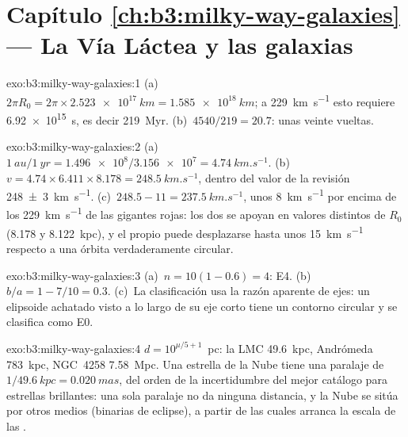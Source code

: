 \section*{Capítulo \ref{ch:b3:milky-way-galaxies} --- La Vía Láctea y las galaxias}

\begin{solution}{exo:b3:milky-way-galaxies:1}
(a)~$2\pi R_0 = 2\pi\times\qty{2.523e17}{km} = \qty{1.585e18}{km}$; a
\qty{229}{km.s^{-1}} esto requiere \qty{6.92e15}{s}, es decir
\qty{219}{Myr}. (b)~$4540/219 = 20.7$: unas veinte vueltas.
\end{solution}

\begin{solution}{exo:b3:milky-way-galaxies:2}
(a)~$\qty{1}{au}/\qty{1}{yr} = \num{1.496e8}/\num{3.156e7} =
\qty{4.74}{km.s^{-1}}$. (b)~$v = 4.74\times6.411\times8.178 =
\qty{248.5}{km.s^{-1}}$, dentro del valor de la revisión
\qty[separate-uncertainty=true]{248 \pm 3}{km.s^{-1}}. (c)~$248.5 - 11 = \qty{237.5}{km.s^{-1}}$,
unos \qty{8}{km.s^{-1}} por encima de los \qty{229}{km.s^{-1}} de las gigantes rojas:
los dos se apoyan en valores distintos de $R_0$ (8.178 y \qty{8.122}{kpc}),
y el propio  puede desplazarse hasta unos \qty{15}{km.s^{-1}} respecto
a una órbita verdaderamente circular.
\end{solution}

\begin{solution}{exo:b3:milky-way-galaxies:3}
(a)~$n = 10(1 - 0.6) = 4$: E4. (b)~$b/a = 1 - 7/10 = 0.3$. (c)~La clasificación
usa la razón aparente de ejes: un elipsoide achatado visto a lo largo de su eje corto
tiene un contorno circular y se clasifica como E0.
\end{solution}

\begin{solution}{exo:b3:milky-way-galaxies:4}
$d = 10^{\mu/5 + 1}$~pc: la LMC \qty{49.6}{kpc}, Andrómeda
\qty{783}{kpc}, NGC~4258 \qty{7.58}{Mpc}. Una estrella de la Nube tiene una
paralaje de $1/\qty{49.6}{kpc} = \qty{0.020}{mas}$, del orden de la incertidumbre del mejor
catálogo para estrellas brillantes: una sola paralaje no da ninguna
distancia, y la Nube se sitúa por otros medios (binarias de eclipse),
a partir de las cuales arranca la escala de las .
\end{solution}

